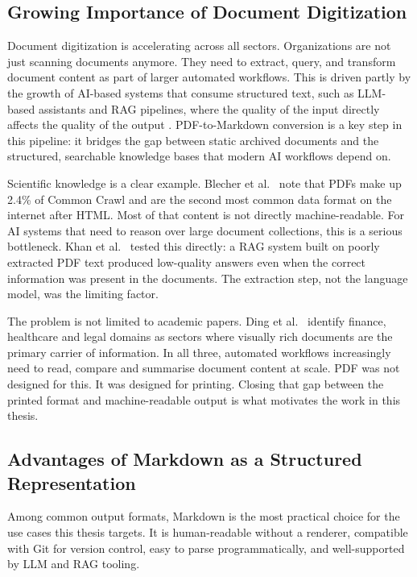 \subsection{Growing Importance of Document Digitization}

Document digitization is accelerating across all sectors. Organizations are
not just scanning documents anymore. They need to extract, query, and
transform document content as part of larger automated workflows. This is
driven partly by the growth of AI-based systems that consume structured text,
such as LLM-based assistants and RAG pipelines, where the quality of the
input directly affects the quality of the output \autocite{khan2024}.
PDF-to-Markdown conversion is a key step in this pipeline: it bridges the
gap between static archived documents and the structured, searchable
knowledge bases that modern AI workflows depend on.

Scientific knowledge is a clear example. Blecher et al.\ \autocite{blecher2023}
note that PDFs make up 2.4\% of Common Crawl and are the second most
common data format on the internet after HTML. Most of that content is
not directly machine-readable. For AI systems that need to reason over large
document collections, this is a serious bottleneck. Khan et al.\ \autocite{khan2024}
tested this directly: a RAG system built on poorly extracted PDF text produced
low-quality answers even when the correct information was present in the
documents. The extraction step, not the language model, was the limiting factor.

The problem is not limited to academic papers. Ding et al.\ \autocite{ding2026}
identify finance, healthcare and legal domains as sectors where visually rich
documents are the primary carrier of information. In all three, automated
workflows increasingly need to read, compare and summarise document content
at scale. PDF was not designed for this. It was designed for printing.
Closing that gap between the printed format and machine-readable output is
what motivates the work in this thesis.

\subsection{Advantages of Markdown as a Structured Representation}

Among common output formats, Markdown is the most practical choice for the
use cases this thesis targets. It is human-readable without a renderer,
compatible with Git for version control, easy to parse programmatically, and
well-supported by LLM and RAG tooling.

